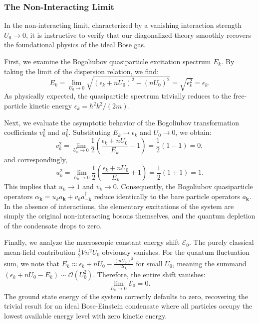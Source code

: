 \subsubsection{The Non-Interacting Limit}

In the non-interacting limit, characterized by a vanishing interaction strength \( U_0 \to 0 \), it is instructive to verify that our diagonalized theory smoothly recovers the foundational physics of the ideal Bose gas.

First, we examine the Bogoliubov quasiparticle excitation spectrum \( E_k \). By taking the limit of the dispersion relation, we find:
\[
    E_k = \lim_{U_0 \to 0} \sqrt{(\epsilon_k + nU_0)^2 - (nU_0)^2} = \sqrt{\epsilon_k^2} = \epsilon_k.
\]
As physically expected, the quasiparticle spectrum trivially reduces to the free-particle kinetic energy \( \epsilon_k = \hbar^2 k^2 / (2m) \).

Next, we evaluate the asymptotic behavior of the Bogoliubov transformation coefficients \( v_k^2 \) and \( u_k^2 \). Substituting \( E_k \to \epsilon_k \) and \( U_0 \to 0 \), we obtain:
\[
    v_k^2 = \lim_{U_0 \to 0} \frac{1}{2} \left( \frac{\epsilon_k + nU_0}{E_k} - 1 \right) = \frac{1}{2}(1 - 1) = 0,
\]
and correspondingly,
\[
    u_k^2 = \lim_{U_0 \to 0} \frac{1}{2} \left( \frac{\epsilon_k + nU_0}{E_k} + 1 \right) = \frac{1}{2}(1 + 1) = 1.
\]
This implies that \( u_k \to 1 \) and \( v_k \to 0 \). Consequently, the Bogoliubov quasiparticle operators \( \alpha_{\mathbf{k}} = u_k a_{\mathbf{k}} + v_k a_{-\mathbf{k}}^\dagger \) reduce identically to the bare particle operators \( a_{\mathbf{k}} \). In the absence of interactions, the elementary excitations of the system are simply the original non-interacting bosons themselves, and the quantum depletion of the condensate drops to zero.

Finally, we analyze the macroscopic constant energy shift \( \mathcal{E}_0 \). The purely classical mean-field contribution \( \frac{1}{2}Vn^2U_0 \) obviously vanishes. For the quantum fluctuation sum, we note that \( E_k \approx \epsilon_k + nU_0 - \frac{(nU_0)^2}{2\epsilon_k} \) for small \( U_0 \), meaning the summand \( (\epsilon_k + nU_0 - E_k) \sim \mathcal{O}(U_0^2) \). Therefore, the entire shift vanishes:
\[
    \lim_{U_0 \to 0} \mathcal{E}_0 = 0.
\]
The ground state energy of the system correctly defaults to zero, recovering the trivial result for an ideal Bose-Einstein condensate where all particles occupy the lowest available energy level with zero kinetic energy.

